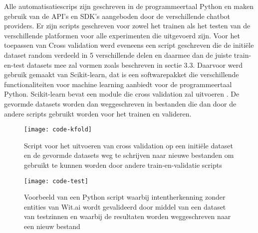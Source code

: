 Alle automatisatiescrips zijn geschreven in de programmeertaal Python en maken gebruik van de API’s en SDK's aangeboden door de verschillende chatbot providers. Er zijn scripts geschreven voor zowel het trainen als het testen van de verschillende platformen voor alle experimenten die uitgevoerd zijn. Voor het toepassen van Cross validation werd eveneens een script geschreven die de initiële dataset random verdeeld in 5 verschillende delen en daarmee dan de juiste train-en-test datasets mee zal vormen zoals beschreven in sectie 3.3. Daarvoor werd gebruik gemaakt van Scikit-learn, dat is een softwarepakket die verschillende functionaliteiten voor machine learning aanbiedt voor de programmeertaal Python. Scikit-learn bevat een module die cross validation zal uitvoeren \autocite{sklearn2020}. De gevormde datasets worden dan weggeschreven in bestanden die dan door de andere scripts gebruikt worden voor het trainen en valideren.

\begin{figure}[H]
    \label{fig:code-kfold}
    \centering
    \texttt{[image: code-kfold]}
    \caption{Script voor het uitvoeren van cross validation op een initiële dataset en de gevormde datasets weg te schrijven naar nieuwe bestanden om gebruikt te kunnen worden door andere train-en-validatie scripts}
\end{figure}

\begin{figure}[H]
    \label{fig:code-validatie}
    \centering
    \texttt{[image: code-test]}
    \caption{Voorbeeld van een Python script waarbij intentherkenning zonder entities van Wit.ai wordt gevalideerd door middel van een dataset van testzinnen en waarbij de resultaten worden weggeschreven naar een nieuw bestand}
\end{figure}

























